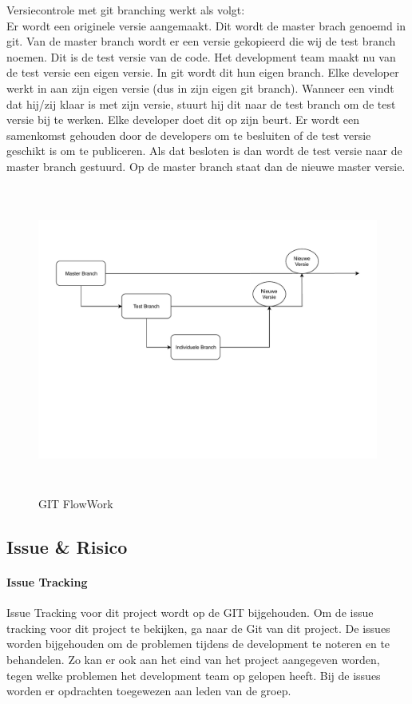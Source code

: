 \documentclass{article}
\begin{document}
Versiecontrole met git branching werkt als volgt:\\
Er wordt een originele versie aangemaakt.
Dit wordt de master brach genoemd in git.
Van de master branch wordt er een versie gekopieerd die wij de test branch noemen.
Dit is de test versie van de code.
Het development team maakt nu van de test versie een eigen versie.
In git wordt dit hun eigen branch. 
Elke developer werkt in aan zijn eigen versie (dus in zijn eigen git branch).
Wanneer een vindt dat hij/zij klaar is met zijn versie,
stuurt hij dit naar de test branch om de test versie bij te werken.
Elke developer doet dit op zijn beurt.
Er wordt een samenkomst gehouden door de developers om te besluiten
of de test versie geschikt is om te publiceren.
Als dat besloten is dan wordt de test versie naar
de master branch gestuurd.
Op de master branch staat dan de nieuwe master versie.

\begin{figure}[!h]
        \centering
        \includegraphics[height=4in]{git.pdf}
        \caption{GIT FlowWork}
        \label{fig: git model}
\end{figure}

\subsection{Issue \& Risico}

\paragraph{Issue Tracking}
Issue Tracking voor dit project wordt op de GIT bijgehouden.
Om de issue tracking voor dit project te bekijken,
ga naar de Git van dit project.
De issues worden bijgehouden om de problemen tijdens de development
te noteren en te behandelen.
Zo kan er ook aan het eind van het project aangegeven worden,
tegen welke problemen het development team op gelopen heeft.
Bij de issues worden er opdrachten toegewezen aan leden van de groep.\\
\end{document}
